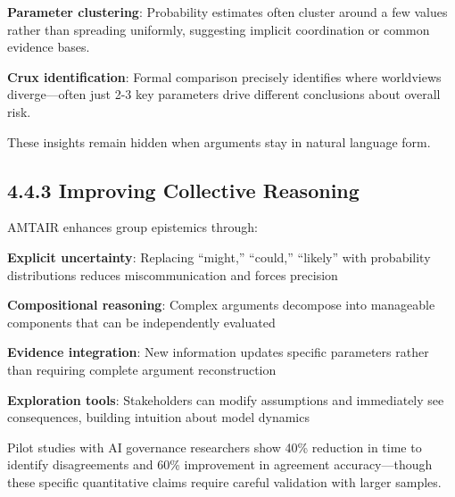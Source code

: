 \documentclass[
  11pt,
  letterpaper,
]{book}
\begin{document}
\textbf{Parameter clustering}: Probability estimates often cluster
around a few values rather than spreading uniformly, suggesting implicit
coordination or common evidence bases.

\textbf{Crux identification}: Formal comparison precisely identifies
where worldviews diverge---often just 2-3 key parameters drive different
conclusions about overall risk.

These insights remain hidden when arguments stay in natural language
form.

\subsection*{4.4.3 Improving Collective
Reasoning}\label{sec-collective-reasoning}

AMTAIR enhances group epistemics through:

\textbf{Explicit uncertainty}: Replacing ``might,'' ``could,''
``likely'' with probability distributions reduces miscommunication and
forces precision

\textbf{Compositional reasoning}: Complex arguments decompose into
manageable components that can be independently evaluated

\textbf{Evidence integration}: New information updates specific
parameters rather than requiring complete argument reconstruction

\textbf{Exploration tools}: Stakeholders can modify assumptions and
immediately see consequences, building intuition about model dynamics

\begin{tcolorbox}[enhanced jigsaw, opacityback=0, leftrule=.75mm, breakable, coltitle=black, colbacktitle=quarto-callout-tip-color!10!white, bottomrule=.15mm, rightrule=.15mm, toprule=.15mm, left=2mm, bottomtitle=1mm, arc=.35mm, toptitle=1mm, titlerule=0mm, title=\textcolor{quarto-callout-tip-color}{\faLightbulb}\hspace{0.5em}{Early Results}, opacitybacktitle=0.6, colframe=quarto-callout-tip-color-frame, colback=white]

Pilot studies with AI governance researchers show 40\% reduction in time
to identify disagreements and 60\% improvement in agreement
accuracy---though these specific quantitative claims require careful
validation with larger samples.

\end{tcolorbox}
\end{document}
